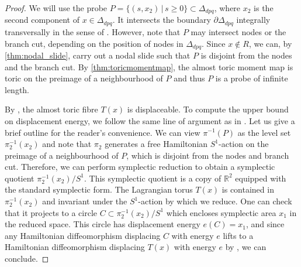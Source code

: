 \documentclass[12pt,a4paper,abstract=true,draft]{scrartcl}
\begin{document}
\begin{proof}
We will use the probe $P = \{(s,x_2) \, \vert \, s ≥ 0\} \subset \Delta_{dpq}$, where $x_2$ is the second component of $x \in \Delta_{dpq}$.
It intersects the boundary $∂ \Delta_{dpq}$ integrally transversally in the sense of \cite[Section 2.1]{mcduff2011displacing}.
However, note that $P$ may intersect nodes or the branch cut, depending on the position of nodes in $\Delta_{dpq}$.
Since $x ∉ R$, we can, by \cref{thm:nodal_slide}, carry out a nodal slide such that $P$ is disjoint from the nodes and the branch cut.
By \cref{thm:toricmomentmap}, the almost toric moment map is toric on the preimage of a neighbourhood of $P$ and thus $P$ is a probe of infinite length.

By \cite[Lemma 2.4]{mcduff2011displacing}, the almost toric fibre $T(x)$ is displaceable.
To compute the upper bound on displacement energy, we follow the same line of argument as in \cite[Proposition 3.4]{brendel2020real}.
Let us give a brief outline for the reader's convenience.
We can view $\pi^{-1}(P)$ as the level set $\pi_2^{-1}(x_2)$ and note that $\pi_2$ generates a free Hamiltonian $S^1$-action on the preimage of a neighbourhood of $P$, which is disjoint from the nodes and branch cut.
Therefore, we can perform symplectic reduction to obtain a symplectic quotient $\pi_2^{-1}(x_2)/S^1$.
This symplectic quotient is a copy of $\mathbb{R}^2$ equipped with the standard symplectic form.
The Lagrangian torus $T(x)$ is contained in $\pi_2^{-1}(x_2)$ and invariant under the $S^1$-action by which we reduce.
One can check that it projects to a circle $C \subset \pi_2^{-1}(x_2)/S^1$ which encloses symplectic area $x_1$ in the reduced space.
This circle has displacement energy $e(C) = x_1$, and since any Hamiltonian diffeomorphism displacing $C$ with energy $e$ lifts to a Hamiltonian diffeomorphism displacing $T(x)$ with energy $e$ by \cite[Lemma 3.1]{brendel2020real}, we can conclude.
\end{proof}
\end{document}
